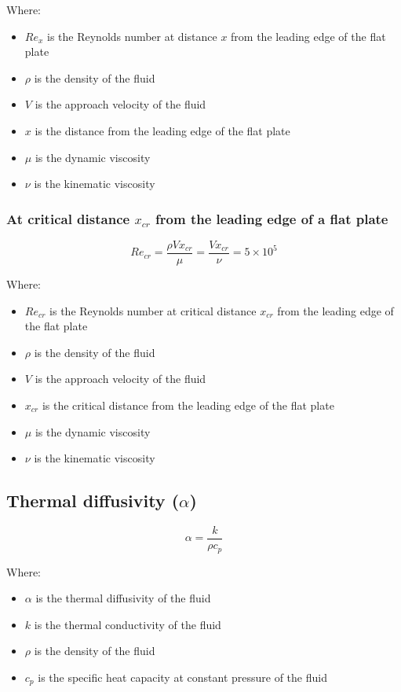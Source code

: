 \documentclass[11pt]{article}
\begin{document}
Where:
\begin{itemize}
\item \(Re_{x}\) is the Reynolds number at distance \(x\) from the leading edge of the flat plate
\item \(\rho\) is the density of the fluid
\item \(V\) is the approach velocity of the fluid
\item \(x\) is the distance from the leading edge of the flat plate
\item \(\mu\) is the dynamic viscosity
\item \(\nu\) is the kinematic viscosity
\end{itemize}
\subsubsection{At critical distance \(x_{cr}\) from the leading edge of a flat plate}
\label{sec:org4df8fbf}
\[Re_{cr} = \frac{\rho V x_{cr}}{\mu} = \frac{V x_{cr}}{\nu} = 5 \times 10^5\]

Where:
\begin{itemize}
\item \(Re_{cr}\) is the Reynolds number at critical distance \(x_{cr}\) from the leading edge of the flat plate
\item \(\rho\) is the density of the fluid
\item \(V\) is the approach velocity of the fluid
\item \(x_{cr}\) is the critical distance from the leading edge of the flat plate
\item \(\mu\) is the dynamic viscosity
\item \(\nu\) is the kinematic viscosity
\end{itemize}

 \newpage
\subsection{Thermal diffusivity (\(\alpha\))}
\label{sec:org5e3eed7}
\[\alpha = \frac{k}{\rho c_p}\]

Where:
\begin{itemize}
\item \(\alpha\) is the thermal diffusivity of the fluid
\item \(k\) is the thermal conductivity of the fluid
\item \(\rho\) is the density of the fluid
\item \(c_p\) is the specific heat capacity at constant pressure of the fluid
\end{itemize}
\end{document}
